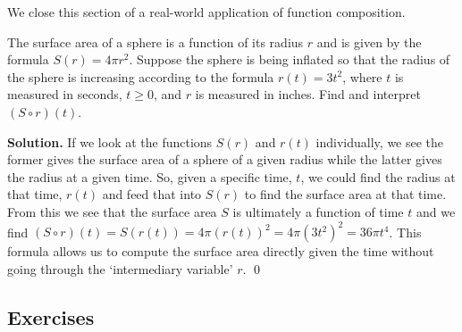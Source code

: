 We close this section of a real-world application of function composition.

\begin{ex}  The surface area of a sphere is a function of its radius $r$ and is given by the formula $S(r) = 4 \pi r^2$.  Suppose the sphere is being inflated so that the radius of the sphere is increasing according to the formula $r(t) = 3t^2$, where $t$ is measured in seconds, $t \geq 0$, and $r$ is measured in inches.  Find and interpret $(S \circ r)(t)$.

{\bf Solution.}  If we look at the functions $S(r)$ and $r(t)$ individually, we see the former gives the surface area of a sphere of a given radius while the latter gives the radius at a given time.    So, given a specific time, $t$, we could find the radius at that time, $r(t)$ and feed that into $S(r)$ to find the surface area at that time.  From this we see that the surface area $S$ is ultimately a function of time $t$ and we find $(S \circ r)(t) = S(r(t)) = 4 \pi (r(t))^2 = 4 \pi \left(3t^2\right)^2 = 36 \pi t^{4}$.  This formula allows us to compute the surface area directly given the time without going through the `intermediary variable' $r$. \qed

\end{ex}

\newpage

\subsection{Exercises}


\closegraphsfile

